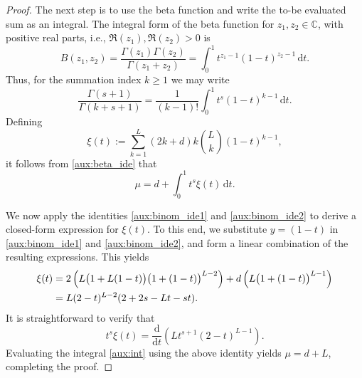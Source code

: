 \documentclass[reqno]{amsart}
\numberwithin{equation}{section}
\numberwithin{figure}{section}
\numberwithin{table}{section}
\theoremstyle{plain}
\theoremstyle{definition}
\theoremstyle{remark}
\newcommand{\di}{\mathrm{d}}   %
\newcommand{\C}{\mathbb{C}}
\begin{document}
\begin{proof}
    The next step is to use the beta function and write the to-be evaluated sum as an integral.
    The integral form of the beta function for \( z_1,z_2 \in \C \), with positive real parts, i.e., \( \Re(z_1), \Re(z_2) > 0 \) is
    \begin{equation*}
        B(z_1, z_2) = \frac{\Gamma(z_1)\Gamma(z_2)}{\Gamma(z_1+z_2)} = \int^1_0 t^{z_1-1} (1-t)^{z_2-1} \, \di t.
    \end{equation*}
    Thus, for the summation index \( k \geq 1 \) we may write
    \begin{equation} \label{aux:beta_ide}
        \frac{\Gamma(s+1)}{\Gamma(k+s+1)} = \frac{1}{(k-1)!} \int^1_0 t^s (1-t)^{k-1} \, \di t.
    \end{equation}
    Defining
    \begin{equation} \label{aux:sigma}
        \xi(t) := \sum^L_{k=1} (2k+d)k\binom{L}{k}(1-t)^{k-1},
    \end{equation}
    it follows from \eqref{aux:beta_ide} that
    \begin{equation} \label{aux:int}
        \mu = d + \int^1_0 t^s \xi(t) \, \di t.
    \end{equation}


    We now apply the identities \eqref{aux:binom_ide1} and \eqref{aux:binom_ide2} to derive a closed-form expression for \( \xi(t) \). 
    To this end, we substitute \( y = (1-t) \) in \eqref{aux:binom_ide1} and \eqref{aux:binom_ide2}, and form a linear combination of the resulting expressions.
    This yields
    \begin{align}
        \xi(t) &= 2 \left( L \big( 1 + L(1-t) \big) \big(1 + (1-t) \big)^{L-2} \right) + d \left( L \big(1 + (1-t) \big)^{L-1} \right) \notag \\
        &= L(2-t)^{L-2}(2 + 2s -Lt -st).
    \end{align}
    It is straightforward to verify that
    \begin{equation*}
        t^s \xi(t) = \frac{\di}{\di t} \left( L t^{s+1} (2-t)^{L-1} \right).
    \end{equation*}
    Evaluating the integral \eqref{aux:int} using the above identity yields \( \mu = d + L \), completing the proof.
\end{proof}
%
\end{document}

